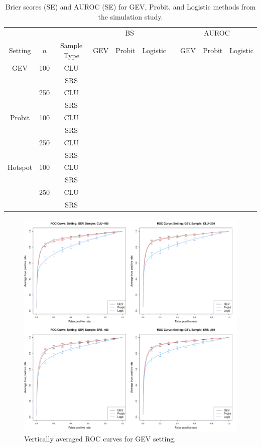 \documentclass[11pt]{article}
\begin{document}
\begin{table}
  \caption{Brier scores (SE) and AUROC (SE) for GEV, Probit, and Logistic methods from the simulation study.}
  \label{rbtbl:simbsresults}
  \centering
  \begin{tabular}{ccclllclll}
  \toprule
    \multicolumn{3}{c}{ }& \multicolumn{3}{c}{BS} & \phantom{abc} & \multicolumn{3}{c}{AUROC}\\
    \cmidrule{4-6} \cmidrule{8-10}
    \multicolumn{1}{c}{Setting} & \multicolumn{1}{c}{$n$} & \multicolumn{1}{c}{Sample Type} & GEV    & Probit & Logistic & \phantom{abc} & GEV    & Probit & Logistic \\
  \midrule
  GEV & 100 & CLU &  &  &  &&  &  &\\
      &     & SRS &  &  &  &&  &  &\\
      & 250 & CLU &  &  &  &&  &  &\\
      &     & SRS &  &  &  &&  &  &\\
  \midrule
  Probit & 100 & CLU &  &  &  &&  &  &\\
         &     & SRS &  &  &  &&  &  &\\
         & 250 & CLU &  &  &  &&  &  &\\
         &     & SRS &  &  &  &&  &  &\\
  \midrule
  Hotspot & 100 & CLU &  &  &  &&  &  &\\
          &     & SRS &  &  &  &&  &  &\\
          & 250 & CLU &  &  &  &&  &  &\\
          &     & SRS &  &  &  &&  &  &\\
  \bottomrule
  \end{tabular}
\end{table}

\begin{figure}
  \includegraphics[width=\linewidth]{plots/sim-perf-gev}
  \caption{Vertically averaged ROC curves for GEV setting.}
  \label{rbfig:simrocgev}
\end{figure}
\end{document}
